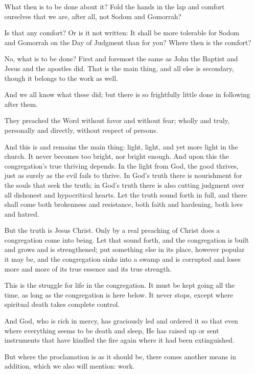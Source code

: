 What then is to be done about it? Fold the hands in the lap and comfort ourselves that we are, after all, not Sodom and Gomorrah?

Is that any comfort? Or is it not written: It shall be more tolerable for Sodom and Gomorrah on the Day of Judgment than for you? Where then is the comfort?

No, what is to be done? First and foremost the same as John the Baptist and Jesus and the apostles did. That is the main thing, and all else is secondary, though it belongs to the work as well.

And we all know what these did; but there is so frightfully little done in following after them.

They preached the Word without favor and without fear; wholly and truly, personally and directly, without respect of persons.

And this is and remains the main thing: light, light, and yet more light in the church. It never becomes too bright, nor bright enough. And upon this the congregation’s true thriving depends. In the light from God, the good thrives, just as surely as the evil fails to thrive. In God’s truth there is nourishment for the souls that seek the truth; in God’s truth there is also cutting judgment over all dishonest and hypocritical hearts. Let the truth sound forth in full, and there shall come both brokenness and resistance, both faith and hardening, both love and hatred.

But the truth is Jesus Christ. Only by a real preaching of Christ does a congregation come into being. Let that sound forth, and the congregation is built and grows and is strengthened; put something else in its place, however popular it may be, and the congregation sinks into a swamp and is corrupted and loses more and more of its true essence and its true strength.

This is the struggle for life in the congregation. It must be kept going all the time, as long as the congregation is here below. It never stops, except where spiritual death takes complete control.

And God, who is rich in mercy, has graciously led and ordered it so that even where everything seems to be death and sleep, He has raised up or sent instruments that have kindled the fire again where it had been extinguished.

But where the proclamation is as it should be, there comes another means in addition, which we also will mention: work.

